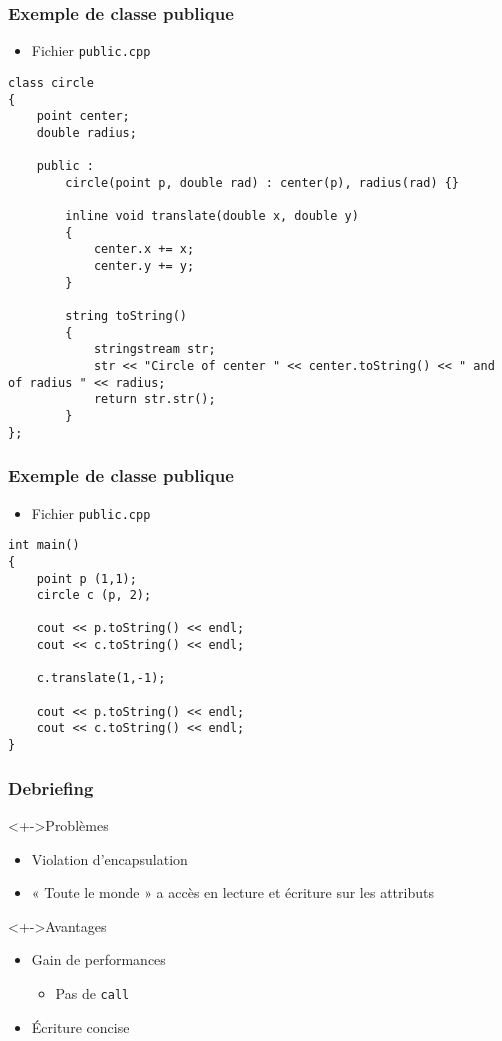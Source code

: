 \begin{frame}[containsverbatim]
\frametitle{Exemple de classe publique}
\begin{itemize}
\item Fichier \texttt{public.cpp}
\end{itemize}
\begin{lstlisting}
class circle
{
	point center;
	double radius;

	public :
		circle(point p, double rad) : center(p), radius(rad) {}

		inline void translate(double x, double y)
		{
			center.x += x;
			center.y += y;
		}

		string toString()
		{			
			stringstream str;
			str << "Circle of center " << center.toString() << " and of radius " << radius;
			return str.str();
		}
};
\end{lstlisting}
\end{frame}

\begin{frame}[containsverbatim]
\frametitle{Exemple de classe publique}
\begin{itemize}
\item Fichier \texttt{public.cpp}
\end{itemize}
\begin{lstlisting}
int main()
{
	point p (1,1);
	circle c (p, 2);

	cout << p.toString() << endl;
	cout << c.toString() << endl;

	c.translate(1,-1);

	cout << p.toString() << endl;
	cout << c.toString() << endl;	
}
\end{lstlisting}
\end{frame}

\begin{frame}
\frametitle{Debriefing}
\begin{alertblock}<+->{Problèmes}
	\begin{itemize}[<+->]
	\item Violation d'encapsulation
	\item « Toute le monde » a accès en lecture et écriture sur les attributs
	\end{itemize}
\end{alertblock}
\begin{block}<+->{Avantages}
	\begin{itemize}[<+->]
	\item Gain de performances
		\begin{itemize}
		\item Pas de \texttt{call}
		\end{itemize}
	\item Écriture concise
	\end{itemize}
\end{block}
\end{frame}

